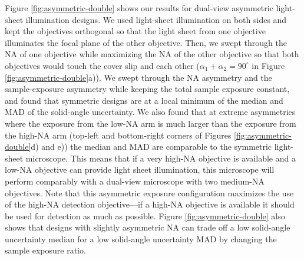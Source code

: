 \documentclass[10pt]{article}
\begin{document}
Figure \ref{fig:asymmetric-double} shows our results for dual-view asymmetric
light-sheet illumination designs. We used light-sheet illumination on both sides
and kept the objectives orthogonal so that the light sheet from one objective
illuminates the focal plane of the other objective. Then, we swept through the
NA of one objective while maximizing the NA of the other objective so that both
objectives would touch the cover slip and each other
($\alpha_1 + \alpha_2 = 90^{\circ}$ in Figure \ref{fig:asymmetric-double}a)). We
swept through the NA asymmetry and the sample-exposure asymmetry while keeping
the total sample exposure constant, and found that symmetric designs are at a
local minimum of the median and MAD of the solid-angle uncertainty. We also
found that at extreme asymmetries where the exposure from the low-NA arm is much
larger than the exposure from the high-NA arm (top-left and bottom-right corners
of Figures \ref{fig:asymmetric-double}d) and e)) the median and MAD are
comparable to the symmetric light-sheet microscope. This means that if a very
high-NA objective is available and a low-NA objective can provide light sheet
illumination, this microscope will perform comparably with a dual-view
microscope with two medium-NA objectives. Note that this asymmetric exposure
configuration maximizes the use of the high-NA detection objective---if a
high-NA objective is available it should be used for detection as much as
possible. Figure \ref{fig:asymmetric-double} also shows that designs with
slightly asymmetric NA can trade off a low solid-angle uncertainty median for a
low solid-angle uncertainty MAD by changing the sample exposure ratio.
\end{document}
